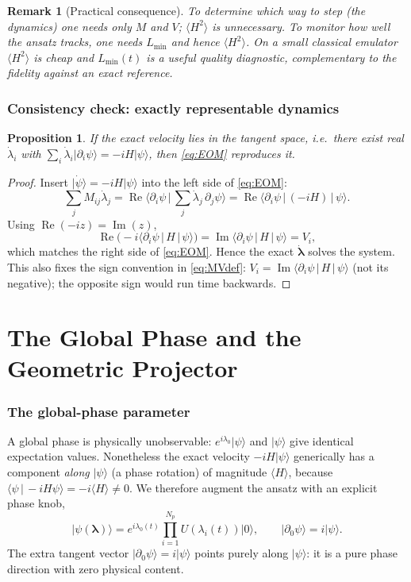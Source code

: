 \documentclass[12pt,a4paper]{article}
\newcommand{\ket}[1]{\lvert #1 \rangle}
\newcommand{\braket}[2]{\langle #1 \,|\, #2 \rangle}
\newcommand{\mel}[3]{\langle #1 \,|\, #2 \,|\, #3 \rangle}
\newcommand{\re}{\operatorname{Re}}
\newcommand{\im}{\operatorname{Im}}
\newcommand{\dlam}{\dot{\boldsymbol{\lambda}}}
\newtheorem{proposition}{Proposition}[section]
\newtheorem{remark}{Remark}[section]
\begin{document}
\begin{remark}[Practical consequence]
To determine \emph{which way to step} (the dynamics) one needs only $M$ and $V$; $\langle H^2\rangle$
is unnecessary. To monitor \emph{how well} the ansatz tracks, one needs $L_{\min}$ and hence
$\langle H^2\rangle$. On a small classical emulator $\langle H^2\rangle$ is cheap and $L_{\min}(t)$
is a useful quality diagnostic, complementary to the fidelity against an exact reference.
\end{remark}

\section{Consistency check: exactly representable dynamics}\label{sec:check}

\begin{proposition}
If the exact velocity lies in the tangent space, i.e.\ there exist real $\dot\lambda_i$ with
$\sum_i\dot\lambda_i\ket{\partial_i\psi}=-iH\ket{\psi}$, then \eqref{eq:EOM} reproduces it.
\end{proposition}
\begin{proof}
Insert $\ket{\dot\psi}=-iH\ket{\psi}$ into the left side of \eqref{eq:EOM}:
\[
  \sum_j M_{ij}\dot\lambda_j=\re\!\Big\langle\partial_i\psi\,\Big|\,\sum_j\dot\lambda_j\,\partial_j\psi\Big\rangle
  =\re\mel{\partial_i\psi}{(-iH)}{\psi}.
\]
Using $\re(-iz)=\im(z)$,
\[
  \re\big(-i\mel{\partial_i\psi}{H}{\psi}\big)=\im\mel{\partial_i\psi}{H}{\psi}=V_i,
\]
which matches the right side of \eqref{eq:EOM}. Hence the exact $\dlam$ solves the system. This
also fixes the sign convention in \eqref{eq:MVdef}: $V_i=\im\mel{\partial_i\psi}{H}{\psi}$ (not its
negative); the opposite sign would run time backwards.
\end{proof}

\newpage
\part{The Global Phase and the Geometric Projector}

\section{The global-phase parameter}\label{sec:phase}

A global phase is physically unobservable: $e^{i\lambda_0}\ket{\psi}$ and $\ket{\psi}$ give identical
expectation values. Nonetheless the exact velocity $-iH\ket{\psi}$ generically has a component
\emph{along} $\ket{\psi}$ (a phase rotation) of magnitude $\langle H\rangle$, because
$\braket{\psi}{-iH\psi}=-i\langle H\rangle\neq0$. We therefore augment the ansatz with an explicit
phase knob,
\begin{equation}
  \ket{\psi(\boldsymbol{\lambda})}=e^{i\lambda_0(t)}\prod_{i=1}^{N_p}U(\lambda_i(t))\ket{0},
  \qquad
  \ket{\partial_0\psi}=i\ket{\psi}.
  \label{eq:phaseansatz}
\end{equation}
The extra tangent vector $\ket{\partial_0\psi}=i\ket{\psi}$ points purely along $\ket{\psi}$: it is a
pure phase direction with zero physical content.
\end{document}

